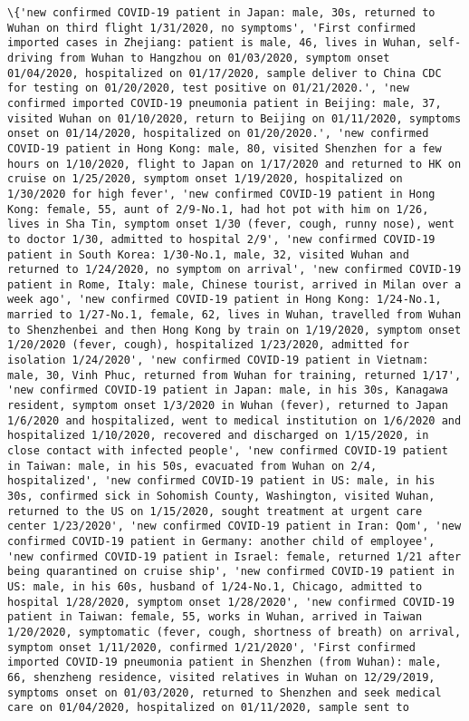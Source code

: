 \documentclass[11pt]{article}
\begin{document}
    \begin{Verbatim}[commandchars=\\\{\}]
\{'new confirmed COVID-19 patient in Japan: male, 30s, returned to Wuhan on third flight 1/31/2020, no symptoms', 'First confirmed imported cases in Zhejiang: patient is male, 46, lives in Wuhan, self-driving from Wuhan to Hangzhou on 01/03/2020, symptom onset 01/04/2020, hospitalized on 01/17/2020, sample deliver to China CDC for testing on 01/20/2020, test positive on 01/21/2020.', 'new confirmed imported COVID-19 pneumonia patient in Beijing: male, 37, visited Wuhan on 01/10/2020, return to Beijing on 01/11/2020, symptoms onset on 01/14/2020, hospitalized on 01/20/2020.', 'new confirmed COVID-19 patient in Hong Kong: male, 80, visited Shenzhen for a few hours on 1/10/2020, flight to Japan on 1/17/2020 and returned to HK on cruise on 1/25/2020, symptom onset 1/19/2020, hospitalized on 1/30/2020 for high fever', 'new confirmed COVID-19 patient in Hong Kong: female, 55, aunt of 2/9-No.1, had hot pot with him on 1/26, lives in Sha Tin, symptom onset 1/30 (fever, cough, runny nose), went to doctor 1/30, admitted to hospital 2/9', 'new confirmed COVID-19 patient in South Korea: 1/30-No.1, male, 32, visited Wuhan and returned to 1/24/2020, no symptom on arrival', 'new confirmed COVID-19 patient in Rome, Italy: male, Chinese tourist, arrived in Milan over a week ago', 'new confirmed COVID-19 patient in Hong Kong: 1/24-No.1, married to 1/27-No.1, female, 62, lives in Wuhan, travelled from Wuhan to Shenzhenbei and then Hong Kong by train on 1/19/2020, symptom onset 1/20/2020 (fever, cough), hospitalized 1/23/2020, admitted for isolation 1/24/2020', 'new confirmed COVID-19 patient in Vietnam: male, 30, Vinh Phuc, returned from Wuhan for training, returned 1/17', 'new confirmed COVID-19 patient in Japan: male, in his 30s, Kanagawa resident, symptom onset 1/3/2020 in Wuhan (fever), returned to Japan 1/6/2020 and hospitalized, went to medical institution on 1/6/2020 and hospitalized 1/10/2020, recovered and discharged on 1/15/2020, in close contact with infected people', 'new confirmed COVID-19 patient in Taiwan: male, in his 50s, evacuated from Wuhan on 2/4, hospitalized', 'new confirmed COVID-19 patient in US: male, in his 30s, confirmed sick in Sohomish County, Washington, visited Wuhan, returned to the US on 1/15/2020, sought treatment at urgent care center 1/23/2020', 'new confirmed COVID-19 patient in Iran: Qom', 'new confirmed COVID-19 patient in Germany: another child of employee', 'new confirmed COVID-19 patient in Israel: female, returned 1/21 after being quarantined on cruise ship', 'new confirmed COVID-19 patient in US: male, in his 60s, husband of 1/24-No.1, Chicago, admitted to hospital 1/28/2020, symptom onset 1/28/2020', 'new confirmed COVID-19 patient in Taiwan: female, 55, works in Wuhan, arrived in Taiwan 1/20/2020, symptomatic (fever, cough, shortness of breath) on arrival, symptom onset 1/11/2020, confirmed 1/21/2020', 'First confirmed imported COVID-19 pneumonia patient in Shenzhen (from Wuhan): male, 66, shenzheng residence, visited relatives in Wuhan on 12/29/2019, symptoms onset on 01/03/2020, returned to Shenzhen and seek medical care on 01/04/2020, hospitalized on 01/11/2020, sample sent to 
\end{Verbatim}
\end{document}
